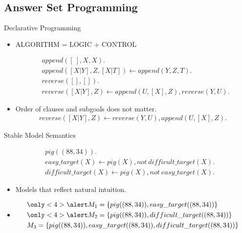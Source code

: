 \documentclass[smaller,dvipsnames]{beamer}
\begin{document}
\subsection{Answer Set Programming}

\begin{frame}{Declarative Programming}
 	\begin{center}
 	\begin{itemize}
	\item<1->[] \begin{center} {\large{ALGORITHM = LOGIC + CONTROL}} \end{center}
		\begin{align*}
			&append ([\:], X, X). \\
			&append ([X|Y], Z, [X|T ]) \leftarrow append (Y, Z, T ). \\
			&reverse([ ], [ ]).\\
			&reverse([X|Y ], Z) \leftarrow append (U, [X], Z), reverse(Y, U ).
		\end{align*}
  \item<2>[] Order of clauses and subgoals does not matter.
  		\begin{align*}
			reverse([X|Y], Z) \leftarrow reverse(Y, U ), append (U, [X], Z).
		\end{align*}
	\end{itemize}	
	\end{center}
\end{frame}

\begin{frame}{Stable Model Semantics}
    \begin{center}
    	\begin{align*}
			&pig((88,34)). \\
			&easy\_target(X) \leftarrow pig(X), not\: difficult\_target(X). \\ 
			&difficult\_target(X) \leftarrow pig(X), not\: easy\_target(X). 
		\end{align*}
    \end{center}
    \begin{itemize}
    	\item<2->[] Models that reflect natural intuition.
    	\item<3->[]
    		\begin{align*}
				&\only<4>{\alert}{ M_1= \{pig((88,34)), easy\_target((88,34))\}  } \\
				&\only<4>{\alert}{ M_2= \{pig((88,34)), difficult\_target((88,34))\}  }\\
				&M_3= \{pig((88,34)), easy\_target((88,34)), difficult\_target((88,34))\}
    		\end{align*}
    \end{itemize}
\end{frame}
\end{document}
